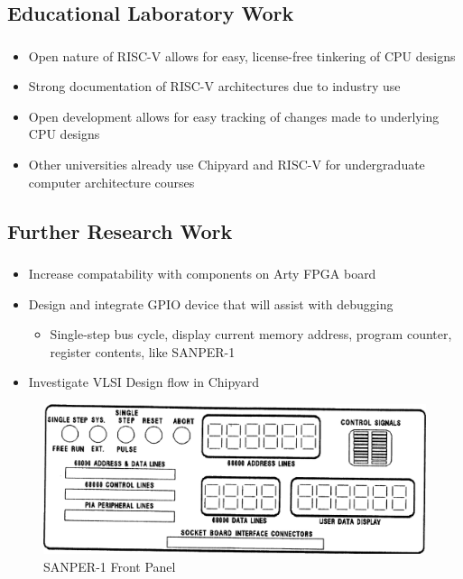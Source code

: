 \documentclass{eceday}
\begin{document}
\subsection{Educational Laboratory Work}\label{subsec:Educational_Lab_Work}
\begin{frame}
  \frametitle{}
  \begin{itemize}
  \item Open nature of RISC-V allows for easy, license-free tinkering of CPU designs
  \item Strong documentation of RISC-V architectures due to industry use
  \item Open development allows for easy tracking of changes made to underlying CPU designs
  \item Other universities already use Chipyard and RISC-V for undergraduate computer architecture courses
  \end{itemize}
\end{frame}

\subsection{Further Research Work}\label{subsec:Further_Research_Work}
\begin{frame}
  \frametitle{}
  \begin{itemize}
  \item Increase compatability with components on Arty FPGA board
  \item Design and integrate GPIO device that will assist with debugging
    \begin{itemize}
    \item Single-step bus cycle, display current memory address, program counter, register contents, like SANPER-1
\end{itemize}
  \item Investigate VLSI Design flow in Chipyard
  \end{itemize}
  \begin{figure}[h!tbp]
    \centering
    \includegraphics[scale=0.25]{./SANPER-Front_Panel.png}
    \caption{SANPER-1 Front Panel \parencite[p.~22]{sanperManual}}
    \label{fig:SANPER_Front_Panel}
  \end{figure}
\end{frame}
\end{document}
